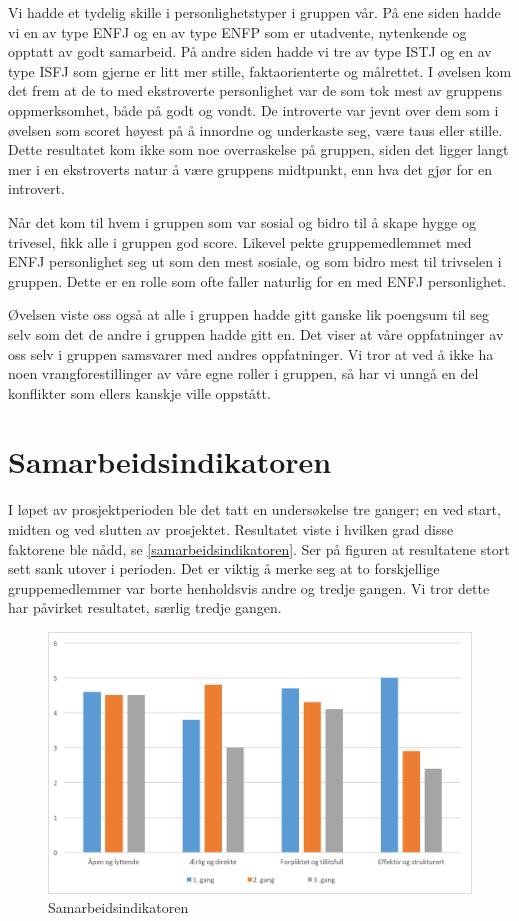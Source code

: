 Vi hadde et tydelig skille i personlighetstyper i gruppen vår. På ene siden hadde vi en av type ENFJ og en av type ENFP som er utadvente, nytenkende og opptatt av godt samarbeid. På andre siden hadde vi tre av type ISTJ og en av type ISFJ som gjerne er litt mer stille, faktaorienterte og målrettet. I øvelsen kom det frem at de to med ekstroverte personlighet var de som tok mest av gruppens oppmerksomhet, både på godt og vondt. De introverte var jevnt over dem som i øvelsen som scoret høyest på å innordne og underkaste seg, være taus eller stille. Dette resultatet kom ikke som noe overraskelse på gruppen, siden det ligger langt mer i en ekstroverts natur å være gruppens midtpunkt, enn hva det gjør for en introvert.

Når det kom til hvem i gruppen som var sosial og bidro til å skape hygge og trivesel, fikk alle i gruppen god score. Likevel pekte gruppemedlemmet med ENFJ personlighet seg ut som den mest sosiale, og som bidro mest til trivselen i gruppen. Dette er en rolle som ofte faller naturlig for en med ENFJ personlighet. 

Øvelsen viste oss også at alle i gruppen hadde gitt ganske lik poengsum til seg selv som det de andre i gruppen hadde gitt en. Det viser at våre oppfatninger av oss selv i gruppen samsvarer med andres oppfatninger. Vi tror at ved å ikke ha noen vrangforestillinger av våre egne roller i gruppen, så har vi unngå en del konflikter som ellers kanskje ville oppstått.

\section{Samarbeidsindikatoren}
I løpet av prosjektperioden ble det tatt en undersøkelse tre ganger; en ved start, midten og ved slutten av prosjektet. Resultatet viste i hvilken grad disse faktorene ble nådd, se \autoref{samarbeidsindikatoren}. Ser på figuren at resultatene stort sett sank utover i perioden. Det er viktig å merke seg at to forskjellige gruppemedlemmer var borte henholdsvis andre og tredje gangen. Vi tror dette har påvirket resultatet, særlig tredje gangen. 
\begin{figure}[!h]
    \centering
    \includegraphics[width=1\textwidth]{gfx/samarbeidsindikatoren.png}
    \caption{Samarbeidsindikatoren}
    \label{samarbeidsindikatoren}
\end{figure}

